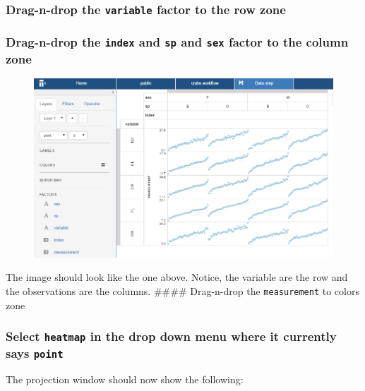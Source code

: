 \documentclass[]{book}
\theoremstyle{definition}
\theoremstyle{definition}
\theoremstyle{remark}
\begin{document}
\subsubsection{\texorpdfstring{Drag-n-drop the \texttt{variable} factor
to the row
zone}{Drag-n-drop the variable factor to the row zone}}\label{drag-n-drop-the-variable-factor-to-the-row-zone}

\subsubsection{\texorpdfstring{Drag-n-drop the \texttt{index} and
\texttt{sp} and \texttt{sex} factor to the column
zone}{Drag-n-drop the index and sp and sex factor to the column zone}}\label{drag-n-drop-the-index-and-sp-and-sex-factor-to-the-column-zone}

\begin{figure}[htbp]
\centering
\includegraphics{images/projection_measurement.png}
\caption{}
\end{figure}

The image should look like the one above. Notice, the variable are the
row and the observations are the columns. \#\#\#\# Drag-n-drop the
\texttt{measurement} to colors zone

\subsubsection{\texorpdfstring{Select \texttt{heatmap} in the drop down
menu where it currently says
\texttt{point}}{Select heatmap in the drop down menu where it currently says point}}\label{select-heatmap-in-the-drop-down-menu-where-it-currently-says-point}

The projection window should now show the following:
\end{document}
